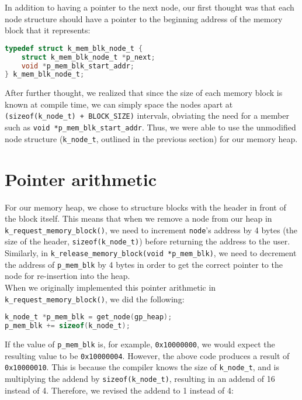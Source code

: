 \documentclass[12pt]{report}
\begin{document}
In addition to having a pointer to the next node, our first thought was that each node structure should have a pointer to the beginning address of the memory block that it represents:

\begin{minipage}{\textwidth}
\begin{lstlisting}[language=C]
typedef struct k_mem_blk_node_t {
    struct k_mem_blk_node_t *p_next;
    void *p_mem_blk_start_addr;
} k_mem_blk_node_t;
\end{lstlisting}
\end{minipage}

After further thought, we realized that since the size of each memory block is known at compile time, we can simply space the nodes apart at \texttt{(sizeof(k_node_t) + BLOCK_SIZE)} intervals, obviating the need for a member such as \texttt{void *p_mem_blk_start_addr}. Thus, we were able to use the unmodified node structure (\texttt{k_node_t}, outlined in the previous section) for our memory heap.

\section{Pointer arithmetic}

For our memory heap, we chose to structure blocks with the header in front of the block itself. This means that when we remove a node from our heap in \texttt{k_request_memory_block()}, we need to increment \texttt{node}'s address by 4 bytes (the size of the header, \texttt{sizeof(k_node_t)}) before returning the address to the user. Similarly, in \texttt{k_release_memory_block(void *p_mem_blk)}, we need to decrement the address of \texttt{p_mem_blk} by 4 bytes in order to get the correct pointer to the node for re-insertion into the heap.\\

When we originally implemented this pointer arithmetic in \texttt{k_request_memory_block()}, we did the following:

\begin{minipage}{\textwidth}
\begin{lstlisting}[language=C]
k_node_t *p_mem_blk = get_node(gp_heap);
p_mem_blk += sizeof(k_node_t);
\end{lstlisting}
\end{minipage}

If the value of \texttt{p_mem_blk} is, for example, \texttt{0x10000000}, we would expect the resulting value to be \texttt{0x10000004}. However, the above code produces a result of \texttt{0x10000010}. This is because the compiler knows the size of \texttt{k_node_t}, and is multiplying the addend by \texttt{sizeof(k_node_t)}, resulting in an addend of 16 instead of 4. Therefore, we revised the addend to 1 instead of 4:
\end{document}
